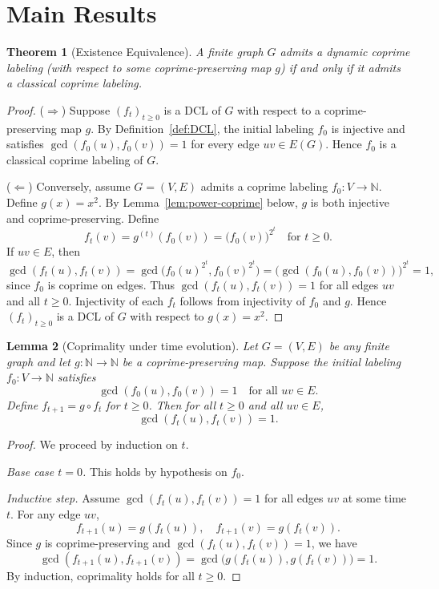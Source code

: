 \documentclass[12pt]{amsart}
\theoremstyle{plain}
\newtheorem{thm}{Theorem}[section]
\newtheorem{lemma}[thm]{Lemma}
\theoremstyle{definition}
\theoremstyle{remark}
\numberwithin{equation}{section}
\begin{document}
\section{Main Results}

\begin{thm}[Existence Equivalence]\label{thm:existence-equivalence}
A finite graph $G$ admits a dynamic coprime labeling (with respect to some coprime-preserving map $g$) if and only if it admits a classical coprime labeling.
\end{thm}

\begin{proof}
($\Rightarrow$) Suppose $(f_t)_{t\ge0}$ is a DCL of $G$ with respect to a coprime-preserving map $g$. By Definition~\ref{def:DCL}, the initial labeling $f_0$ is injective and satisfies $\gcd(f_0(u),f_0(v))=1$ for every edge $uv\in E(G)$. Hence $f_0$ is a classical coprime labeling of $G$.

($\Leftarrow$) Conversely, assume $G=(V,E)$ admits a coprime labeling $f_0:V\to\mathbb{N}$. Define $g(x)=x^2$. By Lemma~\ref{lem:power-coprime} below, $g$ is both injective and coprime-preserving. Define
\[
f_t(v)=g^{(t)}(f_0(v)) = \bigl(f_0(v)\bigr)^{2^t}
\quad\text{for }t\ge0.
\]
If $uv\in E$, then
\[
\gcd(f_t(u),f_t(v))
= \gcd\bigl(f_0(u)^{2^t},f_0(v)^{2^t}\bigr)
= \bigl(\gcd(f_0(u),f_0(v))\bigr)^{2^t}
= 1,
\]
since $f_0$ is coprime on edges. Thus $\gcd(f_t(u),f_t(v))=1$ for all edges $uv$ and all $t\ge0$. Injectivity of each $f_t$ follows from injectivity of $f_0$ and $g$. Hence $(f_t)_{t\ge0}$ is a DCL of $G$ with respect to $g(x)=x^2$.
\end{proof}

\begin{lemma}[Coprimality under time evolution]\label{lem:coprime-persistence}
Let $G=(V,E)$ be any finite graph and let $g:\mathbb N\to\mathbb N$ be a coprime-preserving map. Suppose the initial labeling $f_0:V\to\mathbb N$ satisfies
\[
\gcd(f_0(u),f_0(v))=1\quad\text{for all }uv\in E.
\]
Define $f_{t+1}=g\circ f_t$ for $t\ge0$. Then for all $t\ge0$ and all $uv\in E$,
\[
\gcd(f_t(u),f_t(v))=1.
\]
\end{lemma}

\begin{proof}
We proceed by induction on $t$.

\emph{Base case $t=0$.} This holds by hypothesis on $f_0$.

\emph{Inductive step.} Assume $\gcd(f_t(u),f_t(v))=1$ for all edges $uv$ at some time $t$. For any edge $uv$,
\[
f_{t+1}(u)=g(f_t(u)), \quad f_{t+1}(v)=g(f_t(v)).
\]
Since $g$ is coprime-preserving and $\gcd(f_t(u),f_t(v))=1$, we have
\[
\gcd(f_{t+1}(u),f_{t+1}(v))
= \gcd\bigl(g(f_t(u)),g(f_t(v))\bigr)=1.
\]
By induction, coprimality holds for all $t\ge0$.
\end{proof}
\end{document}
